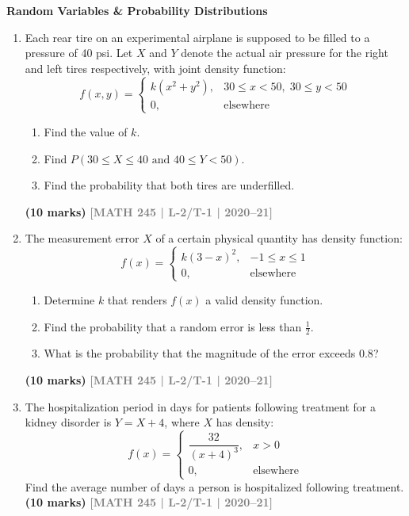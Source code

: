\documentclass[12pt,a4paper]{article}
\newcommand{\yr}[1]{\hfill\textcolor{gray}{\small\textbf{[#1]}}}
\newcommand{\mk}[1]{\textcolor{orange!70!black}{\small\textbf{(#1 marks)}}}
\newcommand{\subtopic}[2]{%
  \vspace{10pt}
  \noindent\begin{tcolorbox}[colback=#1!8,colframe=#1,boxrule=0.6pt,arc=4pt,
    left=6pt,right=6pt,top=4pt,bottom=4pt]
    \small\bfseries\textcolor{#1}{#2}
  \end{tcolorbox}
  \vspace{2pt}
}
\begin{document}
\subtopic{cG}{Random Variables \& Probability Distributions}
\label{sub:s8-rv}

\begin{enumerate}

\item Each rear tire on an experimental airplane is supposed to be filled to a pressure of 40 psi. Let $X$ and $Y$ denote the actual air pressure for the right and left tires respectively, with joint density function:
\[
f(x,y) = \begin{cases} k(x^{2}+y^{2}), & 30 \le x < 50,\; 30 \le y < 50 \\ 0, & \text{elsewhere} \end{cases}
\]
\begin{enumerate}
  \item Find the value of $k$.
  \item Find $P(30 \le X \le 40 \text{ and } 40 \le Y < 50)$.
  \item Find the probability that both tires are underfilled.
\end{enumerate}
\mk{10} \yr{MATH 245 | L-2/T-1 | 2020--21}

\item The measurement error $X$ of a certain physical quantity has density function:
\[
f(x) = \begin{cases} k(3-x)^{2}, & -1 \le x \le 1 \\ 0, & \text{elsewhere} \end{cases}
\]
\begin{enumerate}
  \item Determine $k$ that renders $f(x)$ a valid density function.
  \item Find the probability that a random error is less than $\tfrac{1}{2}$.
  \item What is the probability that the magnitude of the error exceeds $0.8$?
\end{enumerate}
\mk{10} \yr{MATH 245 | L-2/T-1 | 2020--21}

\item The hospitalization period in days for patients following treatment for a kidney disorder is $Y=X+4$, where $X$ has density:
\[
f(x) = \begin{cases} \dfrac{32}{(x+4)^{3}}, & x > 0 \\ 0, & \text{elsewhere} \end{cases}
\]
Find the average number of days a person is hospitalized following treatment.
\mk{10} \yr{MATH 245 | L-2/T-1 | 2020--21}


\end{enumerate}
\end{document}
